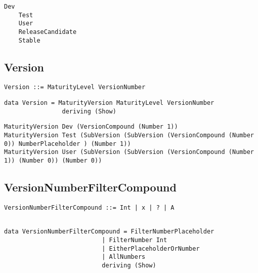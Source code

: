 \documentclass[11pt]{article}
\begin{document}
\begin{lstlisting}[style=Examples]
	Dev
	Test
	User
	ReleaseCandidate
	Stable
\end{lstlisting}

\subsection{Version}

\begin{lstlisting}[caption=BNF]
Version ::= MaturityLevel VersionNumber
\end{lstlisting}

\begin{lstlisting}
data Version = MaturityVersion MaturityLevel VersionNumber
                deriving (Show)
\end{lstlisting}

\begin{lstlisting}[style=Examples]
MaturityVersion Dev (VersionCompound (Number 1))
MaturityVersion Test (SubVersion (SubVersion (VersionCompound (Number 0)) NumberPlaceholder ) (Number 1))
MaturityVersion User (SubVersion (SubVersion (VersionCompound (Number 1)) (Number 0)) (Number 0))
\end{lstlisting}

\subsection{VersionNumberFilterCompound}

\begin{lstlisting}[caption=BNF]			
VersionNumberFilterCompound ::= Int | x | ? | A
\end{lstlisting}

\begin{lstlisting}

data VersionNumberFilterCompound = FilterNumberPlaceholder
                           | FilterNumber Int
                           | EitherPlaceholderOrNumber
                           | AllNumbers
                           deriving (Show)
                           
\end{lstlisting}

\begin{lstlisting}[style=Examples]

\end{lstlisting}
\end{document}
